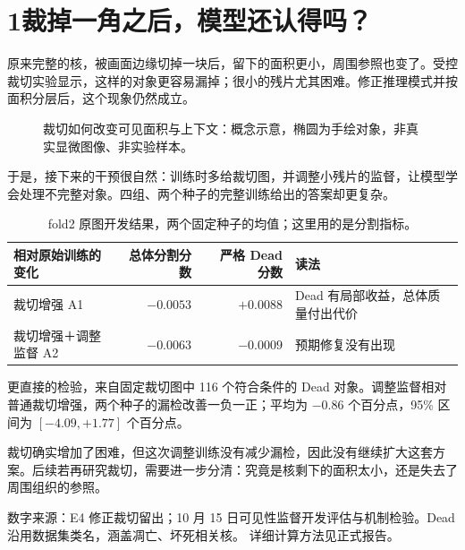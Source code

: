 \documentclass[UTF8,zihao=-4,fontset=windows]{ctexart}
\newcommand{\pagelead}[2]{\section*{#1}\noindent{\large\color{teal}#2}\par\medskip}
\newcommand{\evidence}[1]{\par{\footnotesize\color{gray}数字来源：#1 详细计算方法见正式报告。}\par}
\begin{document}
\newpage
\pagelead{1\quad 裁掉一角之后，模型还认得吗？}{不完整的核更难找，调整训练后是否会改善？}
原来完整的核，被画面边缘切掉一块后，留下的面积更小，周围参照也变了。受控裁切实验显示，这样的对象更容易漏掉；很小的残片尤其困难。修正推理模式并按面积分层后，这个现象仍然成立。

\begin{figure}[H]\centering
{}
\caption{裁切如何改变可见面积与上下文：概念示意，椭圆为手绘对象，非真实显微图像、非实验样本。}
\end{figure}

于是，接下来的干预很自然：训练时多给裁切图，并调整小残片的监督，让模型学会处理不完整对象。四组、两个种子的完整训练给出的答案却更复杂。

\begin{table}[H]\centering\small
\begin{tabularx}{\linewidth}{p{38mm}rrX}\toprule
相对原始训练的变化 & 总体分割分数 & 严格 Dead 分数 & 读法\\\midrule
裁切增强 A1 & $-0.0053$ & $+0.0088$ & Dead 有局部收益，总体质量付出代价\\
裁切增强＋调整监督 A2 & $-0.0063$ & $-0.0009$ & 预期修复没有出现\\\bottomrule
\end{tabularx}
\caption{fold2 原图开发结果，两个固定种子的均值；这里用的是分割指标。}
\end{table}

更直接的检验，来自固定裁切图中 116 个符合条件的 Dead 对象。调整监督相对普通裁切增强，两个种子的漏检改善一负一正；平均为 $-0.86$ 个百分点，95\% 区间为 $[-4.09,+1.77]$ 个百分点。

裁切确实增加了困难，但这次调整训练没有减少漏检，因此没有继续扩大这套方案。后续若再研究裁切，需要进一步分清：究竟是核剩下的面积太小，还是失去了周围组织的参照。
\evidence{E4 修正裁切留出；10 月 15 日可见性监督开发评估与机制检验。Dead 沿用数据集类名，涵盖凋亡、坏死相关核。}
\end{document}
